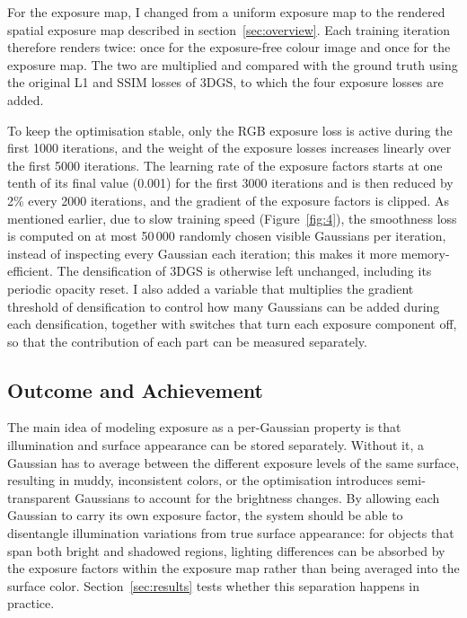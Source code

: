 \documentclass[11pt,a4paper]{article}
\begin{document}
For the exposure map, I changed from a uniform exposure map to the rendered spatial exposure map described in section~\ref{sec:overview}. Each training iteration therefore renders twice: once for the exposure-free colour image and once for the exposure map. The two are multiplied and compared with the ground truth using the original L1 and SSIM losses of 3DGS, to which the four exposure losses are added.

To keep the optimisation stable, only the RGB exposure loss is active during the first 1000 iterations, and the weight of the exposure losses increases linearly over the first 5000 iterations. The learning rate of the exposure factors starts at one tenth of its final value (0.001) for the first 3000 iterations and is then reduced by 2\% every 2000 iterations, and the gradient of the exposure factors is clipped. As mentioned earlier, due to slow training speed (Figure~\ref{fig:4}), the smoothness loss is computed on at most 50\,000 randomly chosen visible Gaussians per iteration, instead of inspecting every Gaussian each iteration; this makes it more memory-efficient. The densification of 3DGS is otherwise left unchanged, including its periodic opacity reset. I also added a variable that multiplies the gradient threshold of densification to control how many Gaussians can be added during each densification, together with switches that turn each exposure component off, so that the contribution of each part can be measured separately.

\subsection{Outcome and Achievement}
\label{sec:outcome}

The main idea of modeling exposure as a per-Gaussian property is that illumination and surface appearance can be stored separately. Without it, a Gaussian has to average between the different exposure levels of the same surface, resulting in muddy, inconsistent colors, or the optimisation introduces semi-transparent Gaussians to account for the brightness changes. By allowing each Gaussian to carry its own exposure factor, the system should be able to disentangle illumination variations from true surface appearance: for objects that span both bright and shadowed regions, lighting differences can be absorbed by the exposure factors within the exposure map rather than being averaged into the surface color. Section~\ref{sec:results} tests whether this separation happens in practice.
\end{document}
